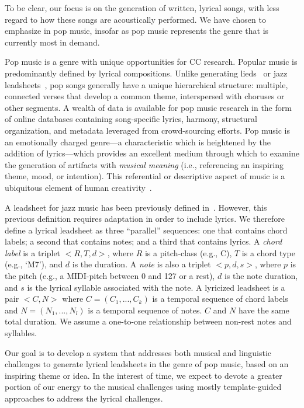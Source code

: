\documentclass[11pt,phd]{byuprop}
\begin{document}
To be clear, our focus is on the generation of written, lyrical songs, with less regard to how these songs are acoustically performed. We have chosen to emphasize in pop music, insofar as pop music represents the genre that is currently most in demand.

Pop music is a genre with unique opportunities for CC research. Popular music is predominantly defined by lyrical compositions. Unlike generating lieds~\cite{toivanen2013automatical} or jazz leadsheets~\cite{pachet2014imitative}, pop songs generally have a unique hierarchical structure: multiple, connected verses that develop a common theme, interspersed with choruses or other segments. A wealth of data is available for pop music research in the form of online databases containing song-specific lyrics, harmony, structural organization, and metadata leveraged from crowd-sourcing efforts. Pop music is an emotionally charged genre---a characteristic which is heightened by the addition of lyrics---which provides an excellent medium through which to examine the generation of artifacts with \emph{musical meaning} (i.e., referencing an inspiring theme, mood, or intention). This referential or descriptive aspect of music is a ubiquitous element of human creativity~\cite{papadopoulos1999ai}.

A leadsheet for jazz music has been previously defined in~\cite{pachet2014imitative}. However, this previous definition requires adaptation in order to include lyrics. We therefore define a lyrical leadsheet as three ``parallel'' sequences: one that contains chord labels; a second that contains notes; and a third that contains lyrics. A \emph{chord label} is a triplet $<R, T, d>$, where $R$ is a pitch-class (e.g., C), $T$ is a chord type (e.g., `M7'), and $d$ is the duration. A \emph{note} is also a triplet $<p,d,s>$, where $p$ is the pitch (e.g., a MIDI-pitch between 0 and 127 or a rest), $d$ is the note duration, and $s$ is the lyrical syllable associated with the note. A lyricized leadsheet is a pair $<C, N>$ where $C = (C_1,...,C_k)$ is a temporal sequence of chord labels and $N = (N_1,...,N_l)$ is a temporal sequence of notes. $C$ and $N$ have the same total duration. We assume a one-to-one relationship between non-rest notes and syllables.

Our goal is to develop a system that addresses both musical and linguistic challenges to generate lyrical leadsheets in the genre of pop music, based on an inspiring theme or idea. In the interest of time, we expect to devote a greater portion of our energy to the musical challenges using mostly template-guided approaches to address the lyrical challenges.
\end{document}
